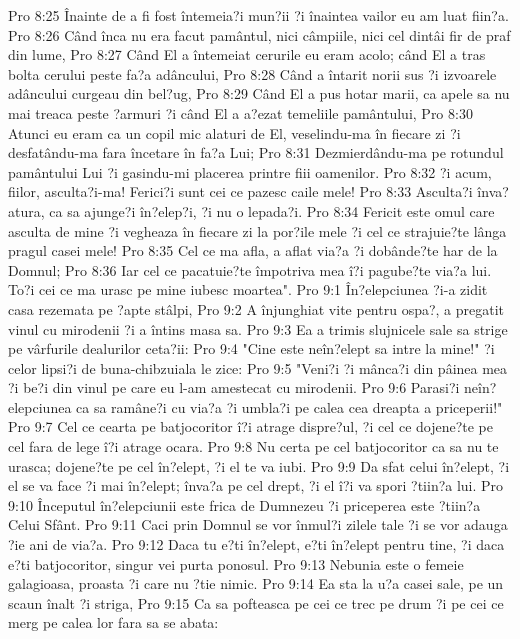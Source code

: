 Pro 8:25  Înainte de a fi fost întemeia?i mun?ii ?i înaintea vailor eu am luat fiin?a.
Pro 8:26  Când înca nu era facut pamântul, nici câmpiile, nici cel dintâi fir de praf din lume,
Pro 8:27  Când El a întemeiat cerurile eu eram acolo; când El a tras bolta cerului peste fa?a adâncului,
Pro 8:28  Când a întarit norii sus ?i izvoarele adâncului curgeau din bel?ug,
Pro 8:29  Când El a pus hotar marii, ca apele sa nu mai treaca peste ?armuri ?i când El a a?ezat temeliile pamântului,
Pro 8:30  Atunci eu eram ca un copil mic alaturi de El, veselindu-ma în fiecare zi ?i desfatându-ma fara încetare în fa?a Lui;
Pro 8:31  Dezmierdându-ma pe rotundul pamântului Lui ?i gasindu-mi placerea printre fiii oamenilor.
Pro 8:32  ?i acum, fiilor, asculta?i-ma! Ferici?i sunt cei ce pazesc caile mele!
Pro 8:33  Asculta?i înva?atura, ca sa ajunge?i în?elep?i, ?i nu o lepada?i.
Pro 8:34  Fericit este omul care asculta de mine ?i vegheaza în fiecare zi la por?ile mele ?i cel ce strajuie?te lânga pragul casei mele!
Pro 8:35  Cel ce ma afla, a aflat via?a ?i dobânde?te har de la Domnul;
Pro 8:36  Iar cel ce pacatuie?te împotriva mea î?i pagube?te via?a lui. To?i cei ce ma urasc pe mine iubesc moartea".
Pro 9:1  În?elepciunea ?i-a zidit casa rezemata pe ?apte stâlpi,
Pro 9:2  A înjunghiat vite pentru ospa?, a pregatit vinul cu mirodenii ?i a întins masa sa.
Pro 9:3  Ea a trimis slujnicele sale sa strige pe vârfurile dealurilor ceta?ii:
Pro 9:4  "Cine este neîn?elept sa intre la mine!" ?i celor lipsi?i de buna-chibzuiala le zice:
Pro 9:5  "Veni?i ?i mânca?i din pâinea mea ?i be?i din vinul pe care eu l-am amestecat cu mirodenii.
Pro 9:6  Parasi?i neîn?elepciunea ca sa ramâne?i cu via?a ?i umbla?i pe calea cea dreapta a priceperii!"
Pro 9:7  Cel ce cearta pe batjocoritor î?i atrage dispre?ul, ?i cel ce dojene?te pe cel fara de lege î?i atrage ocara.
Pro 9:8  Nu certa pe cel batjocoritor ca sa nu te urasca; dojene?te pe cel în?elept, ?i el te va iubi.
Pro 9:9  Da sfat celui în?elept, ?i el se va face ?i mai în?elept; înva?a pe cel drept, ?i el î?i va spori ?tiin?a lui.
Pro 9:10  Începutul în?elepciunii este frica de Dumnezeu ?i priceperea este ?tiin?a Celui Sfânt.
Pro 9:11  Caci prin Domnul se vor înmul?i zilele tale ?i se vor adauga ?ie ani de via?a.
Pro 9:12  Daca tu e?ti în?elept, e?ti în?elept pentru tine, ?i daca e?ti batjocoritor, singur vei purta ponosul.
Pro 9:13  Nebunia este o femeie galagioasa, proasta ?i care nu ?tie nimic.
Pro 9:14  Ea sta la u?a casei sale, pe un scaun înalt ?i striga,
Pro 9:15  Ca sa pofteasca pe cei ce trec pe drum ?i pe cei ce merg pe calea lor fara sa se abata:
